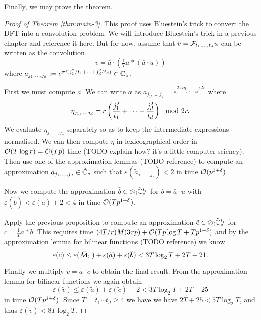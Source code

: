 Finally, we may prove the theorem.

\begin{proof}[Proof of Theorem \eqref{thm:main-3}]
    This proof uses Bluestein's trick to convert the DFT into a convolution problem. We will introduce Bluestein's trick in a previous chapter and reference it here. But for now, assume that $v = \mathcal F_{t_1, \ldots, t_d}u$ can be written as the convolution
    \[
        v = \bar{a} \cdot (\tfrac{1}{T}a \ast (\bar{a} \cdot u))
    \]
    where $a_{j_1, \ldots, j_d} := e^{\pi i (j_1^2 / t_1 + \cdots + j_d^2 / t_d)} \in {\mathbb C}_\circ$.


    First we must compute $a$. We can write $a$ as $a_{j_1, \ldots, j_d} = e^{2\pi i \eta_{j_1, \ldots, j_d}/2r}$ where
    \[
        \eta_{j_1, \ldots, j_d} = r\left(\frac{j_1^2}{t_1} + \cdots + \frac{j_d^2}{t_d}\right) \mod 2r.
    \]
    We evaluate $\eta_{j_1, \ldots, j_d}$ separately so as to keep the intermediate expressions normalised. We can then compute $\eta$ in lexicographical order in $\mathcal O(T \log r) = \mathcal O(T p)$ time (TODO explain how? it's a little computer sciency). Then use one of the approximation lemmas (TODO reference) to compute an approximation $\tilde{a}_{j_1, \ldots, j_d} \in \tilde{{\mathbb C}}_\circ$ such that $\varepsilon(\tilde{a}_{j_1, \ldots, j_d}) < 2$ in time $\mathcal O(p^{1 + \delta})$.

    Now we compute the approximation $\tilde{b} \in \otimes_i \tilde{{\mathbb C}}^{t_i}_\circ$ for $b = \bar{a} \cdot u$ with $\varepsilon(\tilde{b}) < \varepsilon(\tilde{a}) + 2 < 4$ in time $\mathcal O(T p^{1 + \delta})$.

    Apply the previous proposition to compute an approximation $\tilde{c} \in \otimes_i \tilde{{\mathbb C}}^{t_i}_\circ$ for $c = \tfrac{1}{T} a \ast b$. This requires time $(4T/r)M(3rp) + \mathcal O(Tp\log T + Tp^{1 + \delta})$ and by the approximation lemma for bilinear functions (TODO reference) we know
    \[
        \varepsilon(\tilde{c}) \le \varepsilon(\tilde{\mathcal M}_{\mathbb C}) + \varepsilon(\tilde{a}) + \varepsilon(\tilde{b}) < 3T\log_2 T + 2T + 21.
    \]

    Finally we multiply $\tilde{v} = \tilde{a} \cdot \tilde{c}$ to obtain the final result. From the approximation lemma for bilinear functions we again obtain
    \[
        \varepsilon(\tilde{v}) \le \varepsilon(\tilde{a}) + \varepsilon(\tilde{c}) + 2 < 3 T \log_2 T + 2T + 25
    \]
    in time $\mathcal O(Tp^{1 + \delta})$. Since $T = t_1\cdots t_d \ge 4$ we have we have $2T + 25 < 5T \log_2 T$, and thus $\varepsilon(\tilde{v}) < 8T\log_2 T$.
\end{proof}

